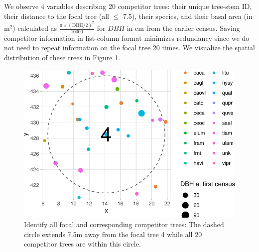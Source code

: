 \documentclass[12pt]{article}
\newenvironment{Shaded}{\begin{snugshade}}{\end{snugshade}}
\newcommand{\CommentTok}[1]{\textcolor[rgb]{0.56,0.35,0.01}{\textit{#1}}}
\newcommand{\DataTypeTok}[1]{\textcolor[rgb]{0.13,0.29,0.53}{#1}}
\newcommand{\DecValTok}[1]{\textcolor[rgb]{0.00,0.00,0.81}{#1}}
\newcommand{\KeywordTok}[1]{\textcolor[rgb]{0.13,0.29,0.53}{\textbf{#1}}}
\newcommand{\NormalTok}[1]{#1}
\newcommand{\OperatorTok}[1]{\textcolor[rgb]{0.81,0.36,0.00}{\textbf{#1}}}
\newcommand{\StringTok}[1]{\textcolor[rgb]{0.31,0.60,0.02}{#1}}
\begin{document}
\begin{Shaded}
\end{Shaded}

We observe 4 variables describing 20 competitor trees: their unique
tree-stem ID, their distance to the focal tree (all \(\leq\) 7.5), their
species, and their basal area (in m\(^2\)) calculated as
\(\frac{\pi \times (\text{DBH/2})^2}{10000}\) for \(DBH\) in cm from the
earlier census. Saving competitor information in list-column format
minimizes redundancy since we do not need to repeat information on the
focal tree 20 times. We visualize the spatial distribution of these
trees in Figure \ref{fig:scbi-focal-vs-comp-map}.

\begin{figure}

{\centering \includegraphics[width=0.66\linewidth]{Figures/scbi-focal-vs-comp-map-1} 

}

\caption{Identify all focal and corresponding competitor trees: The dashed circle extends 7.5m away from the focal tree 4 while all 20 competitor trees are within this circle.}\label{fig:scbi-focal-vs-comp-map}
\end{figure}
\end{document}
